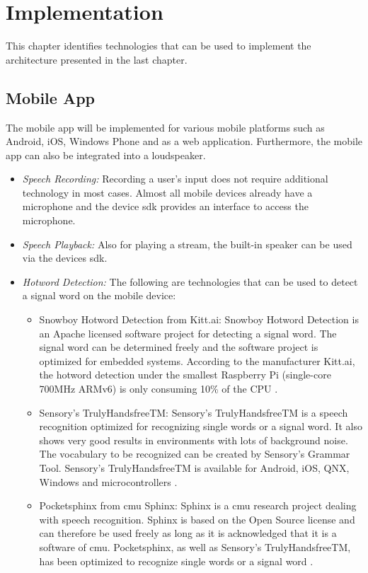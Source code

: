 \section{Implementation}\label{sec:umsetzung}
This chapter identifies technologies that can be used to implement the architecture presented in the last chapter.

\subsection{Mobile App}
The mobile app will be implemented for various mobile platforms such as Android, iOS, Windows Phone and as a web application. Furthermore, the mobile app can also be integrated into a loudspeaker.
\begin{itemize}
	\item \textsl{Speech Recording:} Recording a user's input does not require additional technology in most cases. Almost all mobile devices already have a microphone and the device \acs{sdk} provides an interface to access the microphone.
	\item \textsl{Speech Playback:} Also for playing a stream, the built-in speaker can be used via the devices \acs{sdk}.
	\item \textsl{Hotword Detection:} The following are technologies that can be used to detect a signal word on the mobile device:
	\begin{itemize}
		\item Snowboy Hotword Detection from Kitt.ai: Snowboy Hotword Detection is an Apache licensed software project for detecting a signal word. The signal word can be determined freely and the software project is optimized for embedded systems. According to the manufacturer Kitt.ai, the hotword detection under the smallest Raspberry Pi (single-core 700MHz ARMv6) is only consuming 10\% of the CPU \cite{SnowboyHotwordDetection}.
		\item Sensory's TrulyHandsfreeTM: Sensory's TrulyHandsfreeTM is a speech recognition optimized for recognizing single words or a signal word. It also shows very good results in environments with lots of background noise. The vocabulary to be recognized can be created by Sensory's Grammar Tool. Sensory's TrulyHandsfreeTM is available for Android, iOS, QNX, Windows and microcontrollers \cite{TrulyHandsfreeTM}.
		\item Pocketsphinx from \acs{cmu} Sphinx: Sphinx is a \ac{cmu} research project dealing with speech recognition. Sphinx is based on the Open Source license and can therefore be used freely as long as it is acknowledged that it is a software of \ac{cmu}. Pocketsphinx, as well as Sensory's TrulyHandsfreeTM, has been optimized to recognize single words or a signal word \cite{Pocketsphinx}.
	\end{itemize}
\end{itemize}

